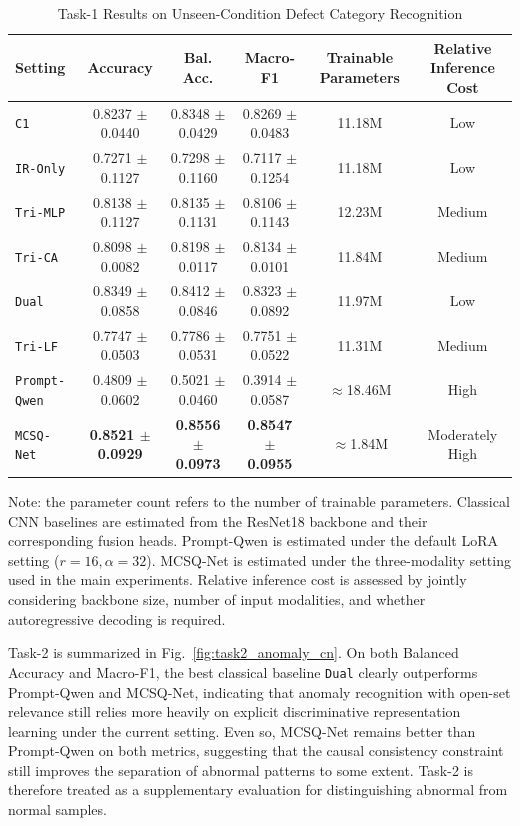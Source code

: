 \documentclass[journal]{IEEEtran}
\begin{document}
\begin{table}[!t]
\caption{Task-1 Results on Unseen-Condition Defect Category Recognition}
\label{tab:data1_main_cn}
\centering
\footnotesize
\setlength{\tabcolsep}{4.2pt}
\begin{tabular*}{\textwidth}{@{\extracolsep{\fill}}lccccc@{}}
\toprule
Setting & Accuracy & Bal. Acc. & Macro-F1 & Trainable Parameters & Relative Inference Cost \\
\midrule
\texttt{C1} & 0.8237 $\pm$ 0.0440 & 0.8348 $\pm$ 0.0429 & 0.8269 $\pm$ 0.0483 & 11.18M & Low \\
\texttt{IR-Only} & 0.7271 $\pm$ 0.1127 & 0.7298 $\pm$ 0.1160 & 0.7117 $\pm$ 0.1254 & 11.18M & Low \\
\texttt{Tri-MLP} & 0.8138 $\pm$ 0.1127 & 0.8135 $\pm$ 0.1131 & 0.8106 $\pm$ 0.1143 & 12.23M & Medium \\
\texttt{Tri-CA} & 0.8098 $\pm$ 0.0082 & 0.8198 $\pm$ 0.0117 & 0.8134 $\pm$ 0.0101 & 11.84M & Medium \\
\texttt{Dual} & 0.8349 $\pm$ 0.0858 & 0.8412 $\pm$ 0.0846 & 0.8323 $\pm$ 0.0892 & 11.97M & Low \\
\texttt{Tri-LF} & 0.7747 $\pm$ 0.0503 & 0.7786 $\pm$ 0.0531 & 0.7751 $\pm$ 0.0522 & 11.31M & Medium \\
\texttt{Prompt-Qwen} & 0.4809 $\pm$ 0.0602 & 0.5021 $\pm$ 0.0460 & 0.3914 $\pm$ 0.0587 & $\approx$18.46M & High \\
\texttt{MCSQ-Net} & \textbf{0.8521 $\pm$ 0.0929} & \textbf{0.8556 $\pm$ 0.0973} & \textbf{0.8547 $\pm$ 0.0955} & $\approx$1.84M & Moderately High \\
\bottomrule
\end{tabular*}
\vspace{2pt}
{\footnotesize Note: the parameter count refers to the number of trainable parameters. Classical CNN baselines are estimated from the ResNet18 backbone and their corresponding fusion heads. Prompt-Qwen is estimated under the default LoRA setting ($r=16,\alpha=32$). MCSQ-Net is estimated under the three-modality setting used in the main experiments. Relative inference cost is assessed by jointly considering backbone size, number of input modalities, and whether autoregressive decoding is required.}
\end{table}

Task-2 is summarized in Fig.~\ref{fig:task2_anomaly_cn}. On both Balanced Accuracy and Macro-F1, the best classical baseline \texttt{Dual} clearly outperforms Prompt-Qwen and MCSQ-Net, indicating that anomaly recognition with open-set relevance still relies more heavily on explicit discriminative representation learning under the current setting. Even so, MCSQ-Net remains better than Prompt-Qwen on both metrics, suggesting that the causal consistency constraint still improves the separation of abnormal patterns to some extent. Task-2 is therefore treated as a supplementary evaluation for distinguishing abnormal from normal samples.
\end{document}
